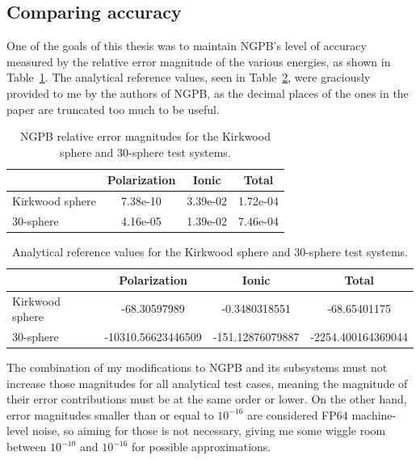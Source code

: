 \subsection{Comparing accuracy}
\label{sec:evaluation-experimental-setup-comparing-accuracy}

One of the goals of this thesis was to maintain NGPB's level of accuracy measured by the relative error magnitude of the various energies, as shown in Table~\ref{tab:ngpb-error-magnitudes}. 
The analytical reference values, seen in Table~\ref{tab:ngpb-analytical-values}, were graciously provided to me by the authors of NGPB, as the decimal places of the ones in the paper are truncated too much to be useful.

\begin{table}[htbp]
    \centering
    \begin{tabular}{lccc}
        \toprule
         & Polarization & Ionic & Total \\
        \midrule
        Kirkwood sphere & 7.38e-10 & 3.39e-02 & 1.72e-04 \\
        30-sphere       & 4.16e-05 & 1.39e-02 & 7.46e-04 \\
        \bottomrule
    \end{tabular}
    \caption{NGPB relative error magnitudes for the Kirkwood sphere and 30-sphere test systems.}
    \label{tab:ngpb-error-magnitudes}
\end{table}

\begin{table}[htbp]
    \centering
    \begin{tabular}{lccc}
        \toprule
         & Polarization & Ionic & Total \\
        \midrule
        Kirkwood sphere & -68.30597989 & -0.3480318551 & -68.65401175 \\
        30-sphere       & -10310.56623446509 & -151.12876079887 & -2254.400164369044 \\
        \bottomrule
    \end{tabular}
    \caption{Analytical reference values for the Kirkwood sphere and 30-sphere test systems.}
    \label{tab:ngpb-analytical-values}
\end{table}

The combination of my modifications to NGPB and its subsystems must not increase those magnitudes for all analytical test cases, meaning the magnitude of their error contributions must be at the same order or lower. 
On the other hand, error magnitudes smaller than or equal to $10^{-16}$ are considered FP64 machine-level noise, so aiming for those is not necessary, giving me some wiggle room between $10^{-10}$ and $10^{-16}$ for possible approximations.

